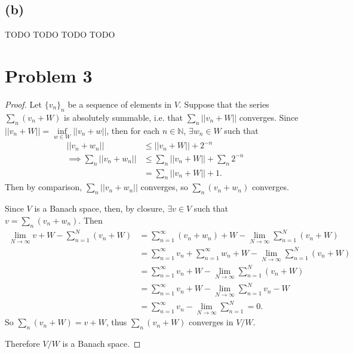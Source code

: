 \documentclass{article}
\begin{document}
\subsection*{(b)}
TODO TODO TODO TODO

\section*{Problem 3}
\begin{proof}
	Let $\{v_n\}_n$ be a sequence of elements in $V$. Suppose that the series $\sum_{n}(v_n+W)$ is absolutely summable, i.e. that $\sum_{n}||v_n + W||$ converges. Since $||v_n + W|| = \inf\limits_{w\in W}||v_n + w||$, then for each $n\in \mathbb{N}$, $\exists w_n \in W$ such that 
	\begin{align}
		||v_n + w_n|| &\leq ||v_n + W|| + 2^{-n} \\
		\implies \sum_{n}||v_n + w_n|| &\leq \sum_{n}||v_n + W|| + \sum_{n}2^{-n} \\
		&= \sum_n ||v_n + W|| + 1.
	\end{align}
	Then by comparison, $\sum_n ||v_n + w_n||$ converges, so $\sum_n (v_n + w_n)$ converges.
	
	Since $V$ is a Banach space, then, by closure, $\exists v \in V$ such that \\ $v = \sum_n (v_n + w_n)$. Then
	\begin{align}
		\lim_{N\to\infty} v+ W - \sum_{n=1}^N (v_n + W) &= \sum_{n=1}^{\infty} (v_n + w_n) + W - \lim_{N\to\infty}\sum_{n=1}^N(v_n + W) \\
		&= \sum_{n=1}^{\infty}v_n + \sum_{n=1}^{\infty}w_n + W -\lim_{N\to\infty}\sum_{n=1}^N(v_n + W) \\
		&= \sum_{n=1}^{\infty}v_n + W -\lim_{N\to\infty}\sum_{n=1}^{N}(v_n + W) \\
		&= \sum_{n=1}^{\infty}v_n + W -\lim_{N\to\infty}\sum_{n=1}^{N} v_n - W \\
		&= \sum_{n=1}^{\infty}v_n - \lim_{N\to\infty}\sum_{n=1}^{N} = 0.
	\end{align}
	So $\sum_n (v_n + W) = v+W$, thus $\sum_n (v_n + W)$ converges in $V/W$.
	
	Therefore $V/W$ is a Banach space.
\end{proof}
\end{document}
